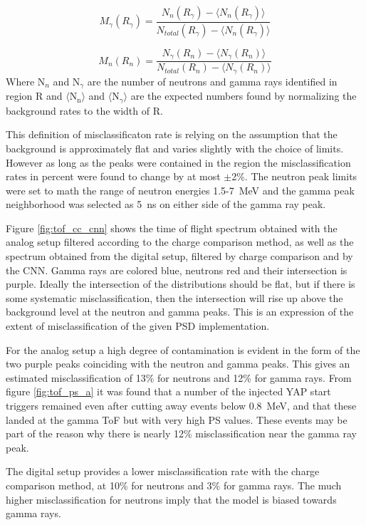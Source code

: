 \documentclass[main.tex]{subfiles}
\begin{document}
\begin{equation}
	M_\gamma(R_\gamma) = \frac{N_{n}(R_\gamma)-\langle N_n(R_\gamma)\rangle}{N_{total}(R_\gamma)-\langle N_n(R_\gamma)\rangle}
\end{equation}

\begin{equation}
	M_n(R_n) = \frac{N_{\gamma}(R_n)-\langle N_\gamma(R_n)\rangle}{N_{total}(R_n)-\langle N_\gamma(R_n)\rangle}
\end{equation}
Where N$_n$ and N$_\gamma$ are the number of neutrons and gamma rays identified in region R and $\langle \textrm{N}_\textrm{n}\rangle$ and $\langle \textrm{N}_\gamma\rangle$ are the expected numbers found by normalizing the background rates to the width of R.

This definition of misclassificaton rate is relying on the assumption that the background is approximately flat and varies slightly with the choice of limits. However as long as the peaks were contained in the region the misclassification rates in percent were found to change by at most $\pm$2\%. The neutron peak limits were set to math the range of neutron energies 1.5-\SI{7}{\MeV} and the gamma peak neighborhood was selected as \SI{5}{\ns} on either side of the gamma ray peak.

Figure \ref{fig:tof_cc_cnn} shows the time of flight spectrum obtained with the analog setup filtered according to the charge comparison method, as well as the spectrum obtained from the digital setup, filtered by charge comparison and by the CNN. Gamma rays are colored blue, neutrons red and their intersection is purple. Ideally the intersection of the distributions should be flat, but if there is some systematic misclassification, then the intersection will rise up above the background level at the neutron and gamma peaks. This is an expression of the extent of misclassification of the given PSD implementation.

For the analog setup a high degree of contamination is evident in the form of the two purple peaks coinciding with the neutron and gamma peaks. This gives an estimated misclassification of 13\% for neutrons and 12\% for gamma rays. From figure \ref{fig:tof_ps_a} it was found that a number of the injected YAP start triggers remained even after cutting away events below \SI{0.8}{\MeV}, and that these landed at the gamma ToF but with very high PS values. These events may be part of the reason why there is nearly 12\% misclassification near the gamma ray peak.

The digital setup provides a lower misclassification rate with the charge comparison method, at 10\% for neutrons and 3\% for gamma rays. The much higher misclassification for neutrons imply that the model is biased towards gamma rays.
\end{document}
